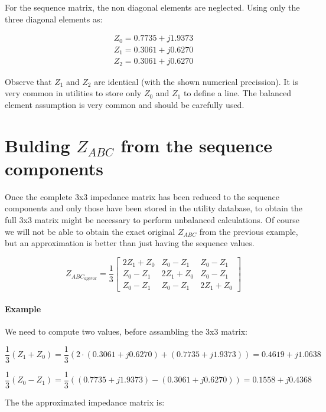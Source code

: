 \documentclass{tufte-book}
\begin{document}
For the sequence matrix, the non diagonal elements are neglected. Using only the three diagonal elements as:

$$
\begin{array}{c}
Z_0 = 0.7735 + j 1.9373 \\
Z_1 = 0.3061 + j 0.6270 \\
Z_2 = 0.3061  +  j 0.6270
\end{array}
$$

Observe that $Z_1$ and $Z_2$ are identical (with the shown numerical precission). It is very common in utilities to store only $Z_0$ and $Z_1$ to define a line. The balanced element assumption is very common and should be carefully used.

\section{Bulding $Z_{ABC}$ from the sequence components}

Once the complete 3x3 impedance matrix has been reduced to the sequence components and only those have been stored in the utility database, to obtain the full 3x3 matrix might be necessary to perform unbalanced calculations. Of course we will not be able to obtain the exact original $Z_{ABC}$ from the previous example, but an approximation is better than just having the sequence values.


\begin{equation}
Z_{ABC_{approx}} = \frac{1}{3}\left[ \begin{array}{ccc}
2Z_1 + Z_0 & Z_0 - Z_1 & Z_0 - Z_1 \\
Z_0 - Z_1 & 2Z_1 + Z_0 & Z_0 - Z_1 \\ 
Z_0 - Z_1 & Z_0 - Z_1 & 2Z_1 + Z_0
\end{array} \right]
\end{equation}

\paragraph{Example}

We need to compute two values, before assambling the 3x3 matrix:

$$
\frac{1}{3}(Z_1 + Z_0) = \frac{1}{3} (2\cdot(0.3061 + j 0.6270) + (0.7735 + j 1.9373)) = 0.4619 + j1.0638
$$

$$
\frac{1}{3} (Z_0 - Z_1) = \frac{1}{3}((0.7735 + j 1.9373) - (0.3061 + j 0.6270)) = 0.1558 + j0.4368
$$

The the approximated impedance matrix is:
\end{document}

